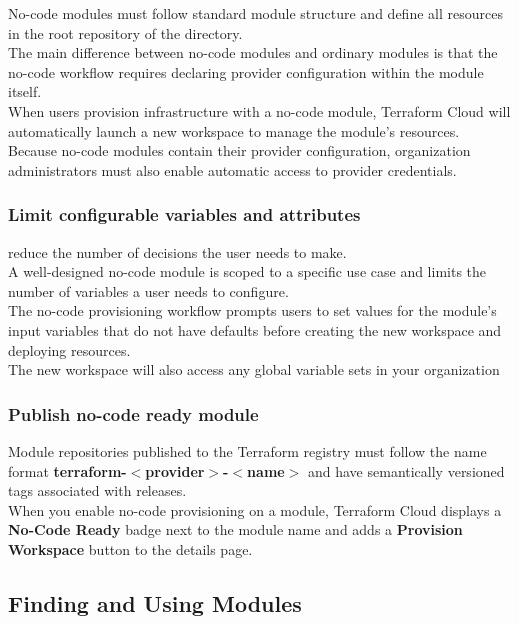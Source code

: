 \documentclass[12pt, letterpaper, twoside]{article}
\begin{document}
No-code modules must follow standard module structure and define all resources in the root 
repository of the directory.\\
The main difference between no-code modules and ordinary modules is that the no-code workflow 
requires declaring provider configuration within the module itself.\\

When users provision infrastructure with a no-code module, Terraform Cloud will automatically launch 
a new workspace to manage the module's resources. Because no-code modules contain their provider 
configuration, organization administrators must also enable automatic access to provider credentials.\\

\subsubsection{Limit configurable variables and attributes}
reduce the number of decisions the user needs to make.\\
A well-designed no-code module is scoped to a specific use case and limits the number of variables 
a user needs to configure.\\

The no-code provisioning workflow prompts users to set values for the module's input variables that 
do not have defaults before creating the new workspace and deploying resources.\\
The new workspace will also access any global variable sets in your organization

\subsubsection{Publish no-code ready module}
Module repositories published to the Terraform registry must follow the name format 
\textbf{terraform-$<$provider$>$-$<$name$>$} and have semantically versioned tags associated 
with releases.\\

When you enable no-code provisioning on a module, Terraform Cloud displays a \textbf{No-Code Ready}
badge next to the module name and adds a \textbf{Provision Workspace} button to the details page.\\

\subsection{Finding and Using Modules}
\end{document}

